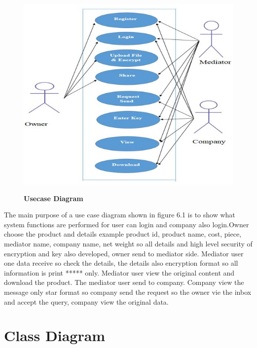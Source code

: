 \documentclass[BTech]{srmuthesis}
\begin{document}
\begin{figure}[H]
\centering
\includegraphics[scale=0.8]{usecase.jpg}
\label{fig:1}\hspace{10mm}
\caption{\textbf{Usecase Diagram}}
\end{figure}
The main purpose of a use case diagram shown in figure 6.1 is to show what system functions are performed for user can login and company also login.Owner choose the product and details example product id, product name, cost, piece, mediator name, company name, net weight so all details and high level security of encryption and key also developed,  owner  send to mediator side. Mediator user one data receive so check the details, the details also encryption format so all information is print ***** only.    Mediator user view the original content and download the product. The mediator user send to company. Company view the message only star format so company send the request so the owner vie the inbox and accept the query, company view the original data.\\
\section{Class Diagram}
\end{document}
